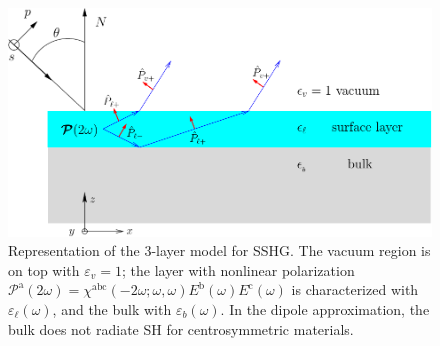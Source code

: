 \begin{figure}
\centering 
\includegraphics[scale=.5]{content/figures/diag-3layer}
\caption{Representation of the 3-layer model for SSHG. The vacuum region is on
top with $\varepsilon_{v}=1$; the layer with nonlinear polarization
$\mathcal{P}^{\mathrm{a}}(2\omega) = \chi^{\mathrm{abc}}(-2\omega;\omega,\omega)
E^{\mathrm{b}}(\omega)E^{\mathrm{c}}(\omega)$ is characterized with
$\varepsilon_{\ell}(\omega)$, and the bulk with $\varepsilon_{b}(\omega)$. In
the dipole approximation, the bulk does not radiate SH for centrosymmetric
materials.}
\label{fig:3layer}
\end{figure}

